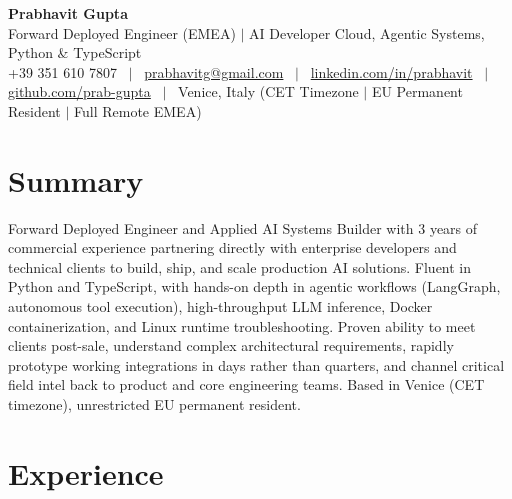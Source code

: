 \documentclass[a4paper,10pt]{article}
\begin{document}
\begin{minipage}[c]{0.80\textwidth}
  {\Huge\bfseries Prabhavit Gupta}\\[3pt]
  {\color{accent}\large Forward Deployed Engineer (EMEA) $\vert$ AI Developer Cloud, Agentic Systems, Python \& TypeScript}\\[6pt]
  {\footnotesize +39 351 610 7807 ~$\vert$~
  \href{mailto:prabhavitg@gmail.com}{prabhavitg@gmail.com} ~$\vert$~
  \href{https://www.linkedin.com/in/prabhavit/}{linkedin.com/in/prabhavit} ~$\vert$~
  \href{https://github.com/prab-gupta}{github.com/prab-gupta} ~$\vert$~
  Venice, Italy (CET Timezone $\vert$ EU Permanent Resident $\vert$ Full Remote EMEA)}
\end{minipage}\hfill

\section{Summary}
Forward Deployed Engineer and Applied AI Systems Builder with 3 years of commercial experience partnering directly with enterprise developers and technical clients to build, ship, and scale production AI solutions. Fluent in Python and TypeScript, with hands-on depth in agentic workflows (LangGraph, autonomous tool execution), high-throughput LLM inference, Docker containerization, and Linux runtime troubleshooting. Proven ability to meet clients post-sale, understand complex architectural requirements, rapidly prototype working integrations in days rather than quarters, and channel critical field intel back to product and core engineering teams. Based in Venice (CET timezone), unrestricted EU permanent resident.

\section{Experience}
\end{document}
